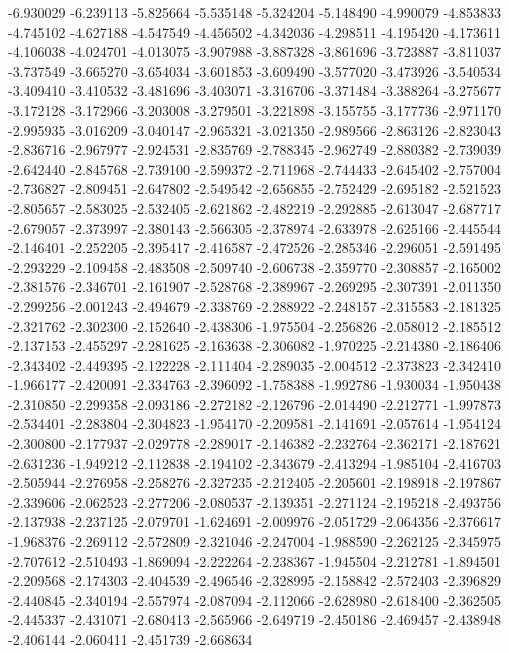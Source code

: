 -6.930029
-6.239113
-5.825664
-5.535148
-5.324204
-5.148490
-4.990079
-4.853833
-4.745102
-4.627188
-4.547549
-4.456502
-4.342036
-4.298511
-4.195420
-4.173611
-4.106038
-4.024701
-4.013075
-3.907988
-3.887328
-3.861696
-3.723887
-3.811037
-3.737549
-3.665270
-3.654034
-3.601853
-3.609490
-3.577020
-3.473926
-3.540534
-3.409410
-3.410532
-3.481696
-3.403071
-3.316706
-3.371484
-3.388264
-3.275677
-3.172128
-3.172966
-3.203008
-3.279501
-3.221898
-3.155755
-3.177736
-2.971170
-2.995935
-3.016209
-3.040147
-2.965321
-3.021350
-2.989566
-2.863126
-2.823043
-2.836716
-2.967977
-2.924531
-2.835769
-2.788345
-2.962749
-2.880382
-2.739039
-2.642440
-2.845768
-2.739100
-2.599372
-2.711968
-2.744433
-2.645402
-2.757004
-2.736827
-2.809451
-2.647802
-2.549542
-2.656855
-2.752429
-2.695182
-2.521523
-2.805657
-2.583025
-2.532405
-2.621862
-2.482219
-2.292885
-2.613047
-2.687717
-2.679057
-2.373997
-2.380143
-2.566305
-2.378974
-2.633978
-2.625166
-2.445544
-2.146401
-2.252205
-2.395417
-2.416587
-2.472526
-2.285346
-2.296051
-2.591495
-2.293229
-2.109458
-2.483508
-2.509740
-2.606738
-2.359770
-2.308857
-2.165002
-2.381576
-2.346701
-2.161907
-2.528768
-2.389967
-2.269295
-2.307391
-2.011350
-2.299256
-2.001243
-2.494679
-2.338769
-2.288922
-2.248157
-2.315583
-2.181325
-2.321762
-2.302300
-2.152640
-2.438306
-1.975504
-2.256826
-2.058012
-2.185512
-2.137153
-2.455297
-2.281625
-2.163638
-2.306082
-1.970225
-2.214380
-2.186406
-2.343402
-2.449395
-2.122228
-2.111404
-2.289035
-2.004512
-2.373823
-2.342410
-1.966177
-2.420091
-2.334763
-2.396092
-1.758388
-1.992786
-1.930034
-1.950438
-2.310850
-2.299358
-2.093186
-2.272182
-2.126796
-2.014490
-2.212771
-1.997873
-2.534401
-2.283804
-2.304823
-1.954170
-2.209581
-2.141691
-2.057614
-1.954124
-2.300800
-2.177937
-2.029778
-2.289017
-2.146382
-2.232764
-2.362171
-2.187621
-2.631236
-1.949212
-2.112838
-2.194102
-2.343679
-2.413294
-1.985104
-2.416703
-2.505944
-2.276958
-2.258276
-2.327235
-2.212405
-2.205601
-2.198918
-2.197867
-2.339606
-2.062523
-2.277206
-2.080537
-2.139351
-2.271124
-2.195218
-2.493756
-2.137938
-2.237125
-2.079701
-1.624691
-2.009976
-2.051729
-2.064356
-2.376617
-1.968376
-2.269112
-2.572809
-2.321046
-2.247004
-1.988590
-2.262125
-2.345975
-2.707612
-2.510493
-1.869094
-2.222264
-2.238367
-1.945504
-2.212781
-1.894501
-2.209568
-2.174303
-2.404539
-2.496546
-2.328995
-2.158842
-2.572403
-2.396829
-2.440845
-2.340194
-2.557974
-2.087094
-2.112066
-2.628980
-2.618400
-2.362505
-2.445337
-2.431071
-2.680413
-2.565966
-2.649719
-2.450186
-2.469457
-2.438948
-2.406144
-2.060411
-2.451739
-2.668634
